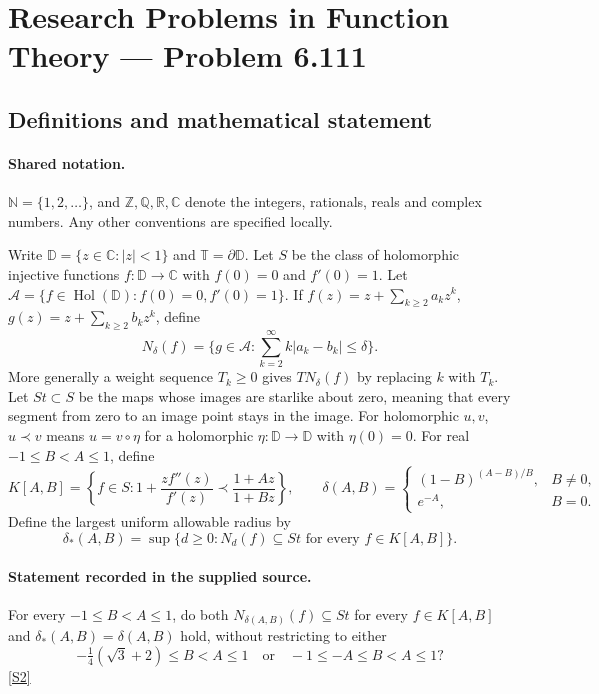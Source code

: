 \documentclass[11pt]{article}
\newcommand{\sref}[2]{\hyperlink{source:#1:#2}{[S#2]}}
\begin{document}
\section{Research Problems in Function Theory — Problem 6.111}\label{statement}

\subsection{Definitions and mathematical statement}

\paragraph{Shared notation.}$\mathbb N=\{1,2,\ldots\}$, and $\mathbb Z,\mathbb Q,\mathbb R,\mathbb C$ denote the integers, rationals, reals and complex numbers. Any other conventions are specified locally.


Write $\mathbb D=\{z\in\mathbb C:|z|<1\}$ and $\mathbb T=\partial\mathbb D$. Let $S$ be the class of holomorphic injective functions $f:\mathbb D\to\mathbb C$ with $f(0)=0$ and $f'(0)=1$. Let $\mathcal A=\{f\in\operatorname{Hol}(\mathbb D):f(0)=0,f'(0)=1\}$. If $f(z)=z+\sum_{k\geq2}a_kz^k$, $g(z)=z+\sum_{k\geq2}b_kz^k$, define
\[N_\delta(f)=\{g\in\mathcal A:\sum_{k=2}^{\infty}k|a_k-b_k|\leq\delta\}.\]
More generally a weight sequence $T_k\geq0$ gives $TN_\delta(f)$ by replacing $k$ with $T_k$. Let $St\subset S$ be the maps whose images are starlike about zero, meaning that every segment from zero to an image point stays in the image. For holomorphic $u,v$, $u\prec v$ means $u=v\circ\eta$ for a holomorphic $\eta:\mathbb D\to\mathbb D$ with $\eta(0)=0$. For real $-1\leq B<A\leq1$, define
\[K[A,B]=\left\{f\in S:1+\frac{zf''(z)}{f'(z)}\prec\frac{1+Az}{1+Bz}\right\},\qquad
\delta(A,B)=\begin{cases}(1-B)^{(A-B)/B},&B\ne0,\\e^{-A},&B=0.\end{cases}\]
Define the largest uniform allowable radius by
\[\delta_*(A,B)=\sup\{d\geq0:N_d(f)\subseteq St\text{ for every }f\in K[A,B]\}.\]
\paragraph{Statement recorded in the supplied source.}
For every $-1\leq B<A\leq1$, do both $N_{\delta(A,B)}(f)\subseteq St$ for every $f\in K[A,B]$ and $\delta_*(A,B)=\delta(A,B)$ hold, without restricting to either
\[-\tfrac14(\sqrt3+2)\leq B<A\leq1\quad\text{or}\quad -1\leq-A\leq B<A\leq1?\] \sref{statement}{2}
\end{document}
